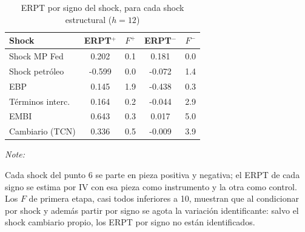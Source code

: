 \begin{table}[!h]
\centering
\caption{ERPT por signo del shock, para cada shock estructural ($h=12$)}
\centering
\fontsize{9}{11}\selectfont
\begin{threeparttable}
\begin{tabular}[t]{lcccc}
\toprule
Shock & ERPT$^{+}$ & $F^{+}$ & ERPT$^{-}$ & $F^{-}$\\
\midrule
Shock MP Fed & 0.202 & 0.1 & 0.181 & 0.0\\
Shock petróleo & -0.599 & 0.0 & -0.072 & 1.4\\
EBP & 0.145 & 1.9 & -0.438 & 0.3\\
Términos interc. & 0.164 & 0.2 & -0.044 & 2.9\\
EMBI & 0.643 & 0.3 & 0.017 & 5.0\\
\addlinespace
Cambiario (TCN) & 0.336 & 0.5 & -0.009 & 3.9\\
\bottomrule
\end{tabular}
\begin{tablenotes}
\item \textit{Note: } 
\item Cada shock del punto 6 se parte en pieza positiva y negativa; el ERPT de cada signo se estima por IV con esa pieza como instrumento y la otra como control. Los $F$ de primera etapa, casi todos inferiores a 10, muestran que al condicionar por shock y además partir por signo se agota la variación identificante: salvo el shock cambiario propio, los ERPT por signo no están identificados.
\end{tablenotes}
\end{threeparttable}
\end{table}